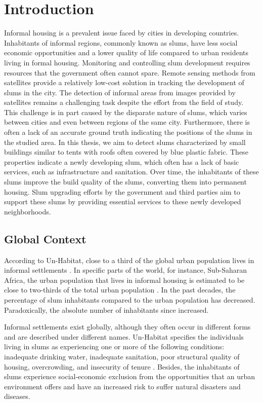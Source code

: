 \section{Introduction}

Informal housing is a prevalent issue faced by cities in developing countries. Inhabitants of informal regions, commonly known as slums, have less social economic opportunities and a lower quality of life compared to urban residents living in formal housing. Monitoring and controlling slum development requires resources that the government often cannot spare. Remote sensing methods from satellites provide a relatively low-cost solution in tracking the development of slums in the city. The detection of informal areas from images provided by satellites remains a challenging task despite the effort from the field of study. This challenge is in part caused by the disparate nature of slums, which varies between cities and even between regions of the same city. Furthermore, there is often a lack of an accurate ground truth indicating the positions of the slums in the studied area. In this thesis, we aim to detect slums characterized by small buildings similar to tents with roofs often covered by blue plastic fabric. These properties indicate a newly developing slum, which often has a lack of basic services, such as infrastructure and sanitation. Over time, the inhabitants of these slums improve the build quality of the slums, converting them into permanent housing. Slum upgrading efforts by the government and third parties aim to support these slums by providing essential services to these newly developed neighborhoods.


\subsection{Global Context}
According to Un-Habitat, close to a third of the global urban population lives in informal settlements \cite{2016state}. In specific parts of the world, for instance, Sub-Saharan Africa, the urban population that lives in informal housing is estimated to be close to two-thirds of the total urban population \cite{un2013planning}. In the past decades, the percentage of slum inhabitants compared to the urban population has decreased. Paradoxically, the absolute number of inhabitants since increased\cite{2016state}.

Informal settlements exist globally, although they often occur in different forms and are described under different names. Un-Habitat specifies the individuals living in slums as experiencing one or more of the following conditions: inadequate drinking water, inadequate sanitation, poor structural quality of housing, overcrowding, and insecurity of tenure \cite{un2015slum}. Besides, the inhabitants of slums experience social-economic exclusion from the opportunities that an urban environment offers and have an increased risk to suffer natural disasters and diseases. 

